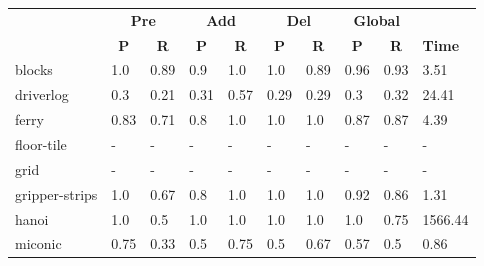 \begin{table}[hbt!]
	\begin{center}
		
		\begin{tabular}{l|l|l|l|l|l|l||l|l|l|}
			& \multicolumn{2}{|c|}{\bf Pre} & \multicolumn{2}{|c|}{\bf Add} & \multicolumn{2}{|c||}{\bf Del} & \multicolumn{2}{|c|}{\bf Global} & \\ \cline{2-9}			
			& \multicolumn{1}{|c|}{\bf P} & \multicolumn{1}{|c|}{\bf R} & \multicolumn{1}{|c|}{\bf P} & \multicolumn{1}{|c|}{\bf R} & \multicolumn{1}{|c|}{\bf P} & \multicolumn{1}{|c||}{\bf R} &  \multicolumn{1}{|c|}{\bf P} & \multicolumn{1}{|c|}{\bf R} & {\bf Time} \\
			\hline
			blocks & 1.0 & 0.89 & 0.9 & 1.0 & 1.0 & 0.89 & 0.96 & 0.93& 3.51 \\ %
			driverlog & 0.3 & 0.21 & 0.31 & 0.57 & 0.29 & 0.29 & 0.3 & 0.32& 24.41 \\ %
			ferry & 0.83 & 0.71 & 0.8 & 1.0 & 1.0 & 1.0 & 0.87 & 0.87& 4.39 \\ %
			floor-tile & - & - & - & - & - & - & - & - & - \\ %
			grid & - & - & - & - & - & - & - & - & - \\ %
			gripper-strips & 1.0 & 0.67 & 0.8 & 1.0 & 1.0 & 1.0 & 0.92 & 0.86& 1.31 \\ %
			hanoi & 1.0 & 0.5 & 1.0 & 1.0 & 1.0 & 1.0 & 1.0 & 0.75& 1566.44 \\ %
			miconic & 0.75 & 0.33 & 0.5 & 0.75 & 0.5 & 0.67 & 0.57 & 0.5& 0.86 \\ %

\end{tabular}
\end{center}
\end{table}
